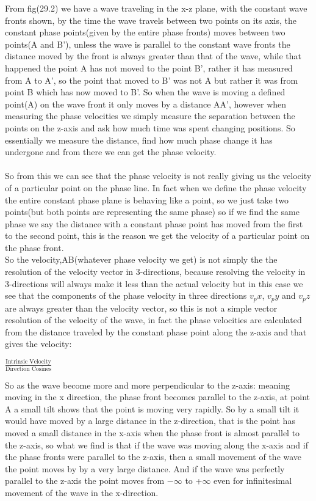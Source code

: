 From fig(29.2) we have a wave traveling in the x-z plane, with the constant wave fronts shown, by the time the wave travels between two points on its axis, the constant phase points(given by the entire phase fronts) moves between two points(A and B'), unless the wave is parallel to the constant wave fronts the distance moved by the front is always greater than that of the wave, while that happened the point A has not moved to the point B', rather it has measured from A to A', so the point that moved to B' was not A but rather it was from point B which has now moved to B'. So when the wave is moving a defined point(A) on the wave front it only moves by a distance AA', however when measuring the phase velocities we simply measure the separation between the points on the z-axis and ask how much time was spent changing positions. So essentially we measure the distance, find how much phase change it has undergone and from there we can get the phase velocity.\\
\\
So from this we can see that the phase velocity is not really giving us the velocity of a particular point on the phase line. In fact when we define the phase velocity the entire constant phase plane is behaving like a point, so we just take two points(but both points are representing the same phase) so if we find the same phase we say the distance with a constant phase point has moved from the first to the second point, this is the reason we get the velocity of a particular point on the phase front.\\

So the velocity,AB(whatever phase velocity we get) is not simply the the resolution of the velocity vector in 3-directions, because resolving the velocity in 3-directions will always make it less than the actual velocity but in this case we see that the components of the phase velocity in three directions $v_px$, $v_py$ and $v_pz$ are always greater than the velocity vector, so this is not a simple vector resolution of the velocity of the wave, in fact the phase velocities are calculated from the distance traveled by the constant phase point along the z-axis and that gives the velocity:

\begin{center}
	$\frac{\text{Intrinsic Velocity}}{\text{Direction Cosines}}$
\end{center}
So as the wave become more and more perpendicular to the z-axis: meaning moving in the x direction, the phase front becomes parallel to the z-axis, at point A a small tilt shows that the point is moving very rapidly. So by a small tilt it would have moved by a large distance in the z-direction, that is the point has moved a small distance in the x-axis when the phase front is almost parallel to the z-axis, so what we find is that if the wave was moving along the x-axis and if the phase fronts were parallel to the z-axis, then a small movement of the wave the point moves by by a very large distance. And if the wave was perfectly parallel to the z-axis the point moves from $-\infty$ to +$\infty$ even for infinitesimal movement of the wave in the x-direction.\\

